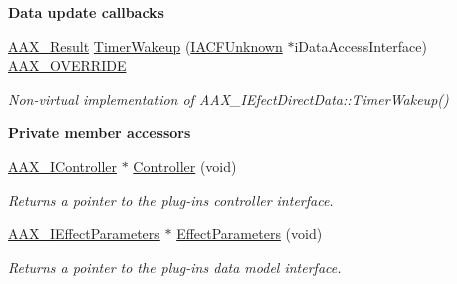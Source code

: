 \begin{Indent}\textbf{ Data update callbacks}\par
\begin{DoxyCompactItemize}
\item 
\mbox{\hyperlink{a00392_a4d8f69a697df7f70c3a8e9b8ee130d2f}{A\+A\+X\+\_\+\+Result}} \mbox{\hyperlink{a01473_a3ed665cfbece195524e208e61b4d1937}{Timer\+Wakeup}} (\mbox{\hyperlink{a01409}{I\+A\+C\+F\+Unknown}} $\ast$i\+Data\+Access\+Interface) \mbox{\hyperlink{a00392_ac2f24a5172689ae684344abdcce55463}{A\+A\+X\+\_\+\+O\+V\+E\+R\+R\+I\+DE}}
\begin{DoxyCompactList}\small\item\em Non-\/virtual implementation of A\+A\+X\+\_\+\+I\+Efect\+Direct\+Data\+::\+Timer\+Wakeup() \end{DoxyCompactList}\end{DoxyCompactItemize}
\end{Indent}
\begin{Indent}\textbf{ Private member accessors}\par
\begin{DoxyCompactItemize}
\item 
\mbox{\hyperlink{a01789}{A\+A\+X\+\_\+\+I\+Controller}} $\ast$ \mbox{\hyperlink{a01473_a33ddee1a300bb3f2584fa224975d362b}{Controller}} (void)
\begin{DoxyCompactList}\small\item\em Returns a pointer to the plug-\/in\textquotesingle{}s controller interface. \end{DoxyCompactList}\item 
\mbox{\hyperlink{a01825}{A\+A\+X\+\_\+\+I\+Effect\+Parameters}} $\ast$ \mbox{\hyperlink{a01473_a774a00f86f4851001f735f161187b05f}{Effect\+Parameters}} (void)
\begin{DoxyCompactList}\small\item\em Returns a pointer to the plug-\/in\textquotesingle{}s data model interface. \end{DoxyCompactList}\end{DoxyCompactItemize}
\end{Indent}
